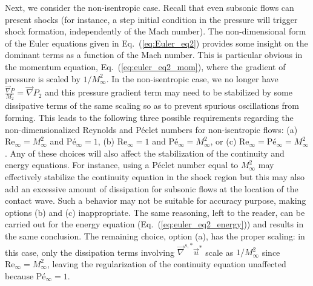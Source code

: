 \documentclass[preprint,10pt]{elsarticle}
\newcommand{\grad}{\vec{\nabla}}
\newcommand{\gradd}[1]{\vec{\nabla}^{#1}}
\renewcommand{\Re}{\textrm{Re}}
\newcommand{\Pe}{\textrm{P\'e}}
\renewcommand{\Pr}{\textrm{Pr}}
\newcommand{\eqt}[1]{Eq.~(\ref{#1})}                     %
\begin{document}
Next, we consider the non-isentropic case. Recall that even subsonic flows can present shocks (for instance, a step initial condition in the pressure will trigger shock formation, independently of the Mach number). The non-dimensional form of the Euler equations given in \eqt{eq:Euler_eq2} provides some insight on the dominant terms as a function of the Mach number. This is particular obvious in the momentum equation, \eqt{eq:euler_eq2_mom}, where the gradient of pressure is scaled by $1/M_\infty^2$. In the non-isentropic case, we no longer have $\frac{\grad P}{M_2}=\grad P_2$ and this pressure gradient term may need to be stabilized by some dissipative terms of the same scaling so as to prevent spurious oscillations from forming. This leads to the following three possible requirements regarding the non-dimensionalized Reynolds and P\'eclet numbers for non-isentropic flows: 
(a) $\Re_\infty = M_\infty^2$ and $\Pe_\infty = 1$,
(b) $\Re_\infty = 1$ and $\Pe_\infty = M_\infty^2$, or
(c) $\Re_\infty = \Pe_\infty = M_\infty^2$. 
%
Any of these choices will also affect the stabilization of the continuity and energy equations. For instance, using a P\'eclet number equal to $M_\infty^2$ may effectively stabilize the continuity equation in the shock region but this may also add an excessive amount of dissipation for subsonic flows at the location of the contact wave. Such a behavior may not be suitable for accuracy purpose, making options (b) and (c) inappropriate. The same reasoning, left to the reader, can be carried out for the energy equation (\eqt{eq:euler_eq2_energy}) and results in the same conclusion. The remaining choice, option (a), has the proper scaling: in this case, only the dissipation terms involving $\gradd{s,*} \vec{u}^*$ scale as $1/M_\infty^2$ since $\Re_\infty = M_\infty^2$, leaving the regularization of the continuity equation unaffected because $\Pe_\infty = 1$.
%
%
%
%
\end{document}
